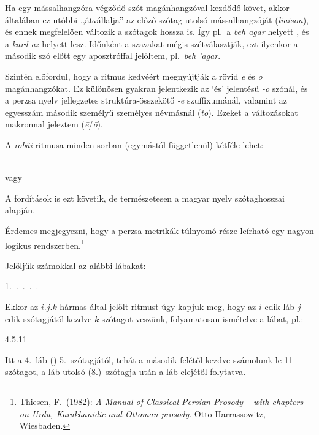 Ha egy mássalhangzóra végződő szót magánhangzóval kezdődő követ, akkor
általában ez utóbbi ,,átvállalja'' az előző szótag utolsó
mássalhangzóját (\emph{liaison}), és ennek megfelelően változik a
szótagok hossza is. Így pl.~a \emph{beh agar} \metra{\m\b\m} helyett
\metra{\b\b\m}, és a \emph{kard az} \metra{\m\b\m} helyett
\metra{\m\m} lesz. Időnként a szavakat mégis szétválasztják, ezt
ilyenkor a második szó előtt egy aposztróffal jelöltem, pl.~\emph{beh
'agar}.

Szintén előfordul, hogy a ritmus kedvéért megnyújtják a rövid \emph{e}
és \emph{o} magánhangzókat. Ez különösen gyakran jelentkezik az `és'
jelentésű \emph{-o} szónál, és a perzsa nyelv jellegzetes
struktúra-összekötő \emph{-e} szuffixumánál, valamint az egyesszám
második személyű személyes névmásnál (\emph{to}). E\-ze\-ket a
változásokat makronnal jeleztem (\emph{ē}/\emph{ō}).

A \emph{robâi} ritmusa minden sorban (egymástól függetlenül) kétféle
lehet:
\begin{center}
  {\large\metra{\m\m\mbb\s\m\m\mbb\s\m\m\mbb\s\m\cc}}\\
  vagy\\
  {\large\metra{\m\m\mbb\s\m\b\m\b\s\m\m\mbb\s\m\cc}}
\end{center}

A fordítások is ezt követik, de természetesen a magyar nyelv
szótaghosszai alapján.

\begin{center}
\end{center}

Érdemes megjegyezni, hogy a perzsa metrikák túlnyomó része leírható
egy nagyon logikus rendszerben.\footnote{Thiesen, F.~(1982): \emph{A Manual of
    Classical Persian Prosody -- with chapters on Urdu, Karakhanidic
    and Ottoman prosody}. Otto Harrassowitz, Wiesbaden.}

Jelöljük számokkal az alábbi lábakat:
\begin{center}
  1.~\metra{\b\m\m}.~\metra{\b\m\m\m}.~\metra{\b\b\m\m}.~\metra{\b\m\b\m\b\b\m\m}.~\metra{\m\m\b\b\m\b\m\b}
\end{center}

Ekkor az $i.j.k$ hármas által jelölt ritmust úgy kapjuk meg, hogy az
$i$-edik láb $j$-edik szótagjától kezdve $k$ szótagot veszünk,
folyamatosan ismételve a lábat, pl.:
\begin{center}
4{.}5{.}11 \metra{\b\b\m\m\s\b\m\b\m\s\b\b\m}
\end{center}
Itt a 4.~láb (\metra{\b\m\b\m\b\b\m\m}) 5.~szótagjától, tehát a második felétől kezdve
számolunk le 11 szótagot, a láb utolsó (8.)~szótagja után a láb elejétől folytatva.

